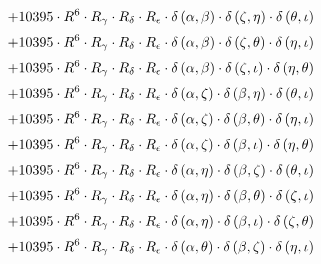 \begin{subequations}
\begin{gather}
 \\[0.2em] \notag 		 + 10395 \cdot R^{6} \cdot R_{\gamma{}} \cdot R_{\delta{}} \cdot R_{\epsilon{}} \cdot \delta{}\left(\alpha{}, \beta{}\right) \cdot \delta{}\left(\zeta{}, \eta{}\right) \cdot \delta{}\left(\theta{}, \iota{}\right) 
 \\[0.2em] \notag 		 + 10395 \cdot R^{6} \cdot R_{\gamma{}} \cdot R_{\delta{}} \cdot R_{\epsilon{}} \cdot \delta{}\left(\alpha{}, \beta{}\right) \cdot \delta{}\left(\zeta{}, \theta{}\right) \cdot \delta{}\left(\eta{}, \iota{}\right) 
 \\[0.2em] \notag 		 + 10395 \cdot R^{6} \cdot R_{\gamma{}} \cdot R_{\delta{}} \cdot R_{\epsilon{}} \cdot \delta{}\left(\alpha{}, \beta{}\right) \cdot \delta{}\left(\zeta{}, \iota{}\right) \cdot \delta{}\left(\eta{}, \theta{}\right) 
 \\[0.2em] \notag 		 + 10395 \cdot R^{6} \cdot R_{\gamma{}} \cdot R_{\delta{}} \cdot R_{\epsilon{}} \cdot \delta{}\left(\alpha{}, \zeta{}\right) \cdot \delta{}\left(\beta{}, \eta{}\right) \cdot \delta{}\left(\theta{}, \iota{}\right) 
 \\[0.2em] \notag 		 + 10395 \cdot R^{6} \cdot R_{\gamma{}} \cdot R_{\delta{}} \cdot R_{\epsilon{}} \cdot \delta{}\left(\alpha{}, \zeta{}\right) \cdot \delta{}\left(\beta{}, \theta{}\right) \cdot \delta{}\left(\eta{}, \iota{}\right) 
 \\[0.2em] \notag 		 + 10395 \cdot R^{6} \cdot R_{\gamma{}} \cdot R_{\delta{}} \cdot R_{\epsilon{}} \cdot \delta{}\left(\alpha{}, \zeta{}\right) \cdot \delta{}\left(\beta{}, \iota{}\right) \cdot \delta{}\left(\eta{}, \theta{}\right) 
 \\[0.2em] \notag 		 + 10395 \cdot R^{6} \cdot R_{\gamma{}} \cdot R_{\delta{}} \cdot R_{\epsilon{}} \cdot \delta{}\left(\alpha{}, \eta{}\right) \cdot \delta{}\left(\beta{}, \zeta{}\right) \cdot \delta{}\left(\theta{}, \iota{}\right) 
 \\[0.2em] \notag 		 + 10395 \cdot R^{6} \cdot R_{\gamma{}} \cdot R_{\delta{}} \cdot R_{\epsilon{}} \cdot \delta{}\left(\alpha{}, \eta{}\right) \cdot \delta{}\left(\beta{}, \theta{}\right) \cdot \delta{}\left(\zeta{}, \iota{}\right) 
 \\[0.2em] \notag 		 + 10395 \cdot R^{6} \cdot R_{\gamma{}} \cdot R_{\delta{}} \cdot R_{\epsilon{}} \cdot \delta{}\left(\alpha{}, \eta{}\right) \cdot \delta{}\left(\beta{}, \iota{}\right) \cdot \delta{}\left(\zeta{}, \theta{}\right) 
 \\[0.2em] \notag 		 + 10395 \cdot R^{6} \cdot R_{\gamma{}} \cdot R_{\delta{}} \cdot R_{\epsilon{}} \cdot \delta{}\left(\alpha{}, \theta{}\right) \cdot \delta{}\left(\beta{}, \zeta{}\right) \cdot \delta{}\left(\eta{}, \iota{}\right) 

\end{gather}
\end{subequations}
